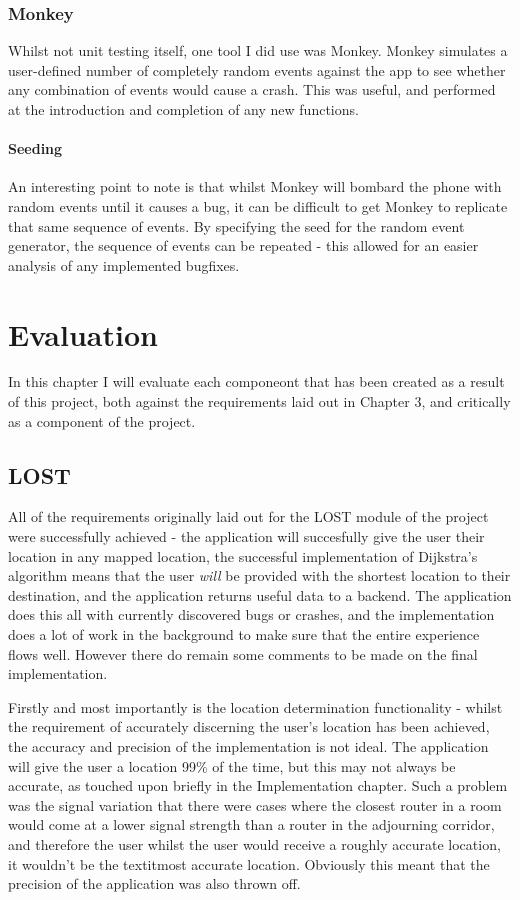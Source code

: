 \documentclass[11pt]{informatics-report}
\begin{document}
\subsection{Monkey}

Whilst not unit testing itself, one tool I did use was Monkey. Monkey simulates a user-defined number of completely random events against the app to see whether any combination of events would cause a crash. This was useful, and performed at the introduction and completion of any new functions.

\subsubsection{Seeding}

An interesting point to note is that whilst Monkey will bombard the phone with random events until it causes a bug, it can be difficult to get Monkey to replicate that same sequence of events. By specifying the seed for the random event generator, the sequence of events can be repeated - this allowed for an easier analysis of any implemented bugfixes. 


\chapter{Evaluation}

In this chapter I will evaluate each componeont that has been created as a result of this project, both against the requirements laid out in Chapter 3, and critically as a component of the project.

\section{LOST} 

All of the requirements originally laid out for the LOST module of the project were successfully achieved - the application will succesfully give the user their location in any mapped location, the successful implementation of Dijkstra's algorithm means that the user \textit{will} be provided with the shortest location to their destination, and the application returns useful data to a backend. The application does this all with currently discovered bugs or crashes, and the implementation does a lot of work in the background to make sure that the entire experience flows well. However there do remain some comments to be made on the final implementation.

Firstly and most importantly is the location determination functionality - whilst the requirement of accurately discerning the user's location has been achieved, the accuracy and precision of the implementation is not ideal. The application will give the user a location 99\% of the time, but this may not always be accurate, as touched upon briefly in the Implementation chapter. Such a problem was the signal variation that there were cases where the closest router in a room would come at a lower signal strength than a router in the adjourning corridor, and therefore the user whilst the user would receive a roughly accurate location, it wouldn't be the textit{most} accurate location. Obviously this meant that the precision of the application was also thrown off.
\end{document}
